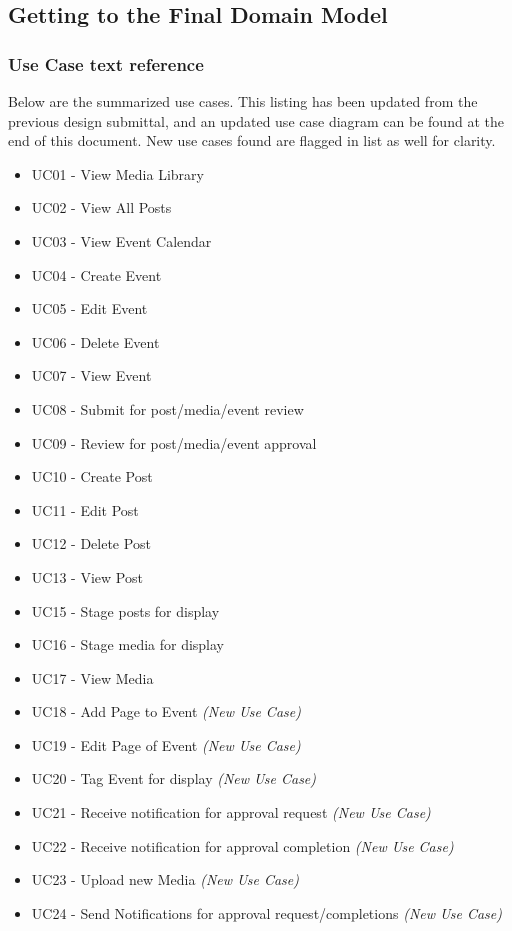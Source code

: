 \documentclass{article}
\begin{document}
\subsection{Getting to the Final Domain Model}
\subsubsection{Use Case text reference}
Below are the summarized use cases.  This listing has been updated from the previous design submittal, and an updated use case diagram can be found at the end of this document.  New use cases found are flagged in list as well for clarity.

\vspace{2ex}
\begin{itemize}
    \item UC01 - View Media Library
    \item UC02 - View All Posts
    \item UC03 - View Event Calendar
    \item UC04 - Create Event
    \item UC05 - Edit Event
    \item UC06 - Delete Event
    \item UC07 - View Event
    \item UC08 - Submit for post/media/event review
    \item UC09 - Review for post/media/event approval
    \item UC10 - Create Post
    \item UC11 - Edit Post
    \item UC12 - Delete Post
    \item UC13 - View Post
    \item UC15 - Stage posts for display
    \item UC16 - Stage media for display
    \item UC17 - View Media
    \item UC18 - Add Page to Event \textit{(New Use Case)}
    \item UC19 - Edit Page of Event \textit{(New Use Case)}
    \item UC20 - Tag Event for display \textit{(New Use Case)}
    \item UC21 - Receive notification for approval request \textit{(New Use Case)}
    \item UC22 - Receive notification for approval completion \textit{(New Use Case)}
    \item UC23 - Upload new Media \textit{(New Use Case)}
    \item UC24 - Send Notifications for approval request/completions \textit{(New Use Case)}
\end{itemize}
\end{document}

